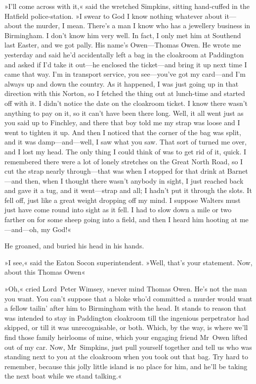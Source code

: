 \divider
»I'll come across with it,« said the wretched Simpkins, sitting hand-cuffed in the Hatfield police-station. »I swear to God I know nothing whatever about it—about the murder, I mean. There's a man I know who has a jewellery business in Birmingham. I don't know him very well. In fact, I only met him at Southend last Easter, and we got pally. His name's Owen—Thomas Owen. He wrote me yesterday and said he'd accidentally left a bag in the cloakroom at Paddington and asked if I'd take it out—he enclosed the ticket—and bring it up next time I came that way. I'm in transport service, you see—you've got my card—and I'm always up and down the country. As it happened, I was just going up in that direction with this Norton, so I fetched the thing out at lunch-time and started off with it. I didn't notice the date on the cloakroom ticket. I know there wasn't anything to pay on it, so it can't have been there long. Well, it all went just as you said up to Finchley, and there that boy told me my strap was loose and I went to tighten it up. And then I noticed that the corner of the bag was split, and it was damp—and—well, I saw what you saw. That sort of turned me over, and I lost my head. The only thing I could think of was to get rid of it, quick. I remembered there were a lot of lonely stretches on the Great North Road, so I cut the strap nearly through—that was when I stopped for that drink at Barnet—and then, when I thought there wasn't anybody in sight, I just reached back and gave it a tug, and it went—strap and all; I hadn't put it through the slots. It fell off, just like a great weight dropping off my mind. I suppose Walters must just have come round into sight as it fell. I had to slow down a mile or two farther on for some sheep going into a field, and then I heard him hooting at me—and—oh, my God!«

He groaned, and buried his head in his hands.

»I see,« said the Eaton Socon superintendent. »Well, that's your statement. Now, about this Thomas Owen\longdash«

»Oh,« cried Lord~Peter Wimsey, »never mind Thomas Owen. He's not the man you want. You can't suppose that a bloke who'd committed a murder would want a fellow tailin' after him to Birmingham with the head. It stands to reason that was intended to stay in Paddington cloakroom till the ingenious perpetrator had skipped, or till it was unrecognisable, or both. Which, by the way, is where we'll find those family heirlooms of mine, which your engaging friend Mr~Owen lifted out of my car. Now, Mr~Simpkins, just pull yourself together and tell us who was standing next to you at the cloakroom when you took out that bag. Try hard to remember, because this jolly little island is no place for him, and he'll be taking the next boat while we stand talking.«

